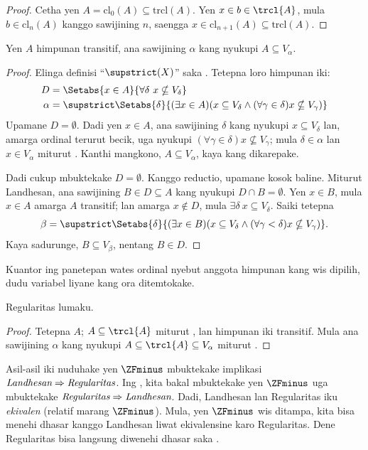\documentclass[../../../include/open-logic-section]{subfiles}
\begin{document}
\begin{proof}
Cetha yen $A = \text{cl}_0(A) \subseteq
\text{trcl}(A)$. Yen $x \in b \in \trcl{A}$,
mula $b \in \text{cl}_n(A)$ kanggo sawijining
$n$, saengga $x \in \text{cl}_{n+1}(A)
\subseteq \text{trcl}(A)$.
\end{proof}

\begin{lem}
Yen $A$ himpunan transitif, ana sawijining
$\alpha$ kang nyukupi $A \subseteq V_\alpha$.
\end{lem}

\begin{proof}
Elinga definisi ``$\supstrict(X)$'' saka
. Tetepna
loro himpunan iki:
\begin{align*}
	D  &= \Setabs{x \in A}{\forall \delta\ x \nsubseteq V_\delta}\\
	\alpha &= \supstrict\Setabs{\delta}{(\exists x \in A)
	(x \subseteq V_\delta \land (\forall \gamma \in \delta)x \nsubseteq V_\gamma)}
\end{align*}
Upamane $D = \emptyset$. Dadi yen $x \in A$,
ana sawijining $\delta$ kang nyukupi
$x \subseteq V_\delta$ lan, amarga ordinal
terurut becik, uga nyukupi
$(\forall \gamma \in \delta)x \nsubseteq V_\gamma$;
mula $\delta \in \alpha$ lan
$x \in V_\alpha$ miturut
.
Kanthi mangkono, $A \subseteq V_{\alpha}$,
kaya kang dikarepake.

Dadi cukup mbuktekake $D = \emptyset$.
Kanggo reductio, upamane kosok baline. Miturut
Landhesan, ana sawijining $B \in D \subseteq A$
kang nyukupi $D \cap B = \emptyset$.
Yen $x \in B$, mula $x \in A$ amarga $A$
transitif; lan amarga $x \notin D$, mula
$\exists \delta\ x \subseteq V_\delta$.
Saiki tetepna
\[
	\beta = \supstrict\Setabs{\delta}{(\exists x \in B)(x \subseteq V_\delta \land (\forall \gamma < \delta)x \nsubseteq V_\gamma)}.
\]
Kaya sadurunge, $B \subseteq V_\beta$,
nentang $B \in D$.
\end{proof}
Kuantor ing panetepan wates ordinal nyebut anggota himpunan kang wis dipilih, dudu variabel liyane kang ora ditemtokake.

\begin{thm}
Regularitas lumaku.
\end{thm}

\begin{proof}
Tetepna $A$; $A \subseteq \trcl{A}$ miturut
, lan himpunan iki transitif.
Mula ana sawijining $\alpha$ kang nyukupi
$A \subseteq \trcl{A} \subseteq V_\alpha$
miturut .
\end{proof}

Asil-asil iki nuduhake yen $\ZFminus$ mbuktekake
implikasi $\emph{Landhesan}\Rightarrow\emph{Regularitas}$.
Ing ,
kita bakal mbuktekake yen $\ZFminus$ uga mbuktekake
$\emph{Regularitas}\Rightarrow\emph{Landhesan}$.
Dadi, Landhesan lan Regularitas iku
\emph{ekivalen} (relatif marang $\ZFminus$).
Mula, yen $\ZFminus$ wis ditampa, kita bisa
menehi dhasar kanggo Landhesan liwat
ekivalensine karo Regularitas. Dene Regularitas
bisa langsung diwenehi dhasar saka
\stageshier{}.
\end{document}
